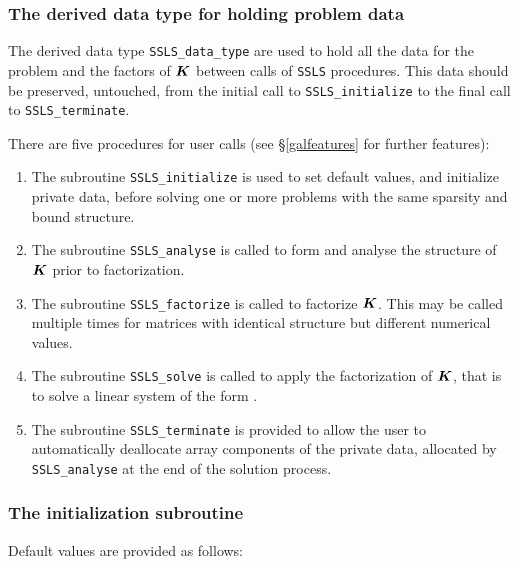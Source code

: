\documentclass{galahad}
\newcommand{\packagename}{SSLS}
\begin{document}

\subsubsection{The derived data type for holding problem data}\label{typedata}
The derived data type
{\tt \packagename\_data\_type}
are used to hold all the data for the problem and the factors of ${\bm{K}}$
between calls of
{\tt \packagename} procedures.
This data should be preserved, untouched, from the initial call to
{\tt \packagename\_initialize}
to the final call to
{\tt \packagename\_terminate}.


\galarguments
There are five procedures for user calls
(see \S\ref{galfeatures} for further features):

\begin{enumerate}
\item The subroutine
      {\tt \packagename\_initialize}
      is used to set default values, and initialize private data,
      before solving one or more problems with the
      same sparsity and bound structure.
\item The subroutine
      {\tt \packagename\_analyse}
      is called to form and analyse the structure of ${\bm{K}}$ prior to 
      factorization.
\item The subroutine
      {\tt \packagename\_factorize}
      is called to factorize ${\bm{K}}$. This may be called multiple times
      for matrices with identical structure but different numerical values.
\item The subroutine
      {\tt \packagename\_solve}
      is called to apply the factorization of ${\bm{K}}$, that is to solve a 
      linear system of the form .
\item The subroutine
      {\tt \packagename\_terminate}
      is provided to allow the user to automatically deallocate array
       components of the private data, allocated by
       {\tt \packagename\_analyse}
       at the end of the solution process.
\end{enumerate}


\subsubsection{The initialization subroutine}\label{subinit}
 Default values are provided as follows:
\vspace*{1mm}
\end{document}
